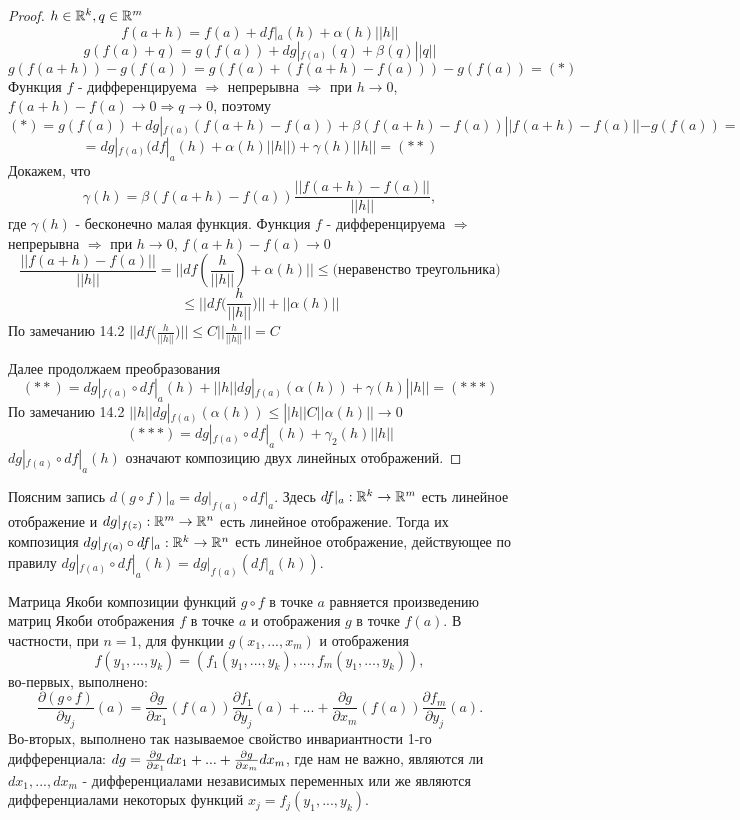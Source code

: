     \begin{proof}
    	$h \in \mathbb R^k, q \in \mathbb R^m$
    	\[ f(a + h) = f(a) + df|_a(h) + \alpha(h) ||h|| \]
    	\[ g(f(a) + q) = g(f(a)) + dg|_{f(a)}(q) + \beta(q)||q|| \]
    	\[ g(f(a + h)) - g(f(a)) = g(f(a) + (f(a + h) - f(a))) - g(f(a)) = (*) \]
    	Функция $f$ - дифференцируема $\Rightarrow$ непрерывна $\Rightarrow$ при $h \to 0$, $f(a + h) - f(a) \to 0 \Rightarrow q \to 0$, поэтому
    	\[ (*) = g(f(a)) + dg|_{f(a)}(f(a + h) - f(a)) + \beta(f(a + h) - f(a))||f(a + h) - f(a)|| - g(f(a)) = \]
    	\[ = dg|_{f(a)}(df|_a(h) + \alpha(h)||h||) + \gamma(h)||h|| = (**) \]
    	Докажем, что 
    	\[ \gamma(h) = \beta(f(a + h) - f(a))\frac{||f(a + h) - f(a)||}{||h||}, \]
    	где $\gamma(h)$ - бесконечно малая функция.
    	Функция $f$ - дифференцируема $\Rightarrow$ непрерывна $\Rightarrow$ при $h \to 0$, $f(a + h) - f(a) \to 0$
    	\[ \frac{||f(a + h) - f(a)||}{||h||} = ||df(\frac{h}{||h||}) + \alpha(h)|| \leqslant \text{(неравенство треугольника)} \]
    	\[ \leqslant ||df\bigg(\frac{h}{||h||}\bigg)|| + ||\alpha(h)|| \]
    	По замечанию 14.2 $||df\big(\frac{h}{||h||}\big)|| \leqslant C||\frac{h}{||h||}|| = C$
    	
    	Далее продолжаем преобразования
    	\[ (**) = dg|_{f(a)} \circ df|_a{(h)} + ||h||dg|_{f(a)}(\alpha(h)) + \gamma(h)||h|| = (***) \]
    	По замечанию 14.2 $||h||dg|_{f(a)}(\alpha(h)) \leqslant ||h||C||\alpha(h)|| \to 0$
    	\[ (***) = dg|_{f(a)} \circ df|_a{(h)} + \gamma_2(h)||h|| \]
    	$dg|_{f(a)} \circ df|_a{(h)}$ означают композицию двух линейных отображений.
    \end{proof}
    
    \begin{mention}
    	Поясним запись $d(g \circ f)|_a = dg|_{f(a)} \circ df|_a$. Здесь $df|_a : \mathbb R^k \rightarrow \mathbb R^m$ есть линейное отображение и $dg|_{f(z)} : \mathbb R^m \rightarrow \mathbb R^n$ есть линейное отображение. Тогда их композиция $dg|_{f(a)} \circ df|_a : \mathbb R^k \rightarrow \mathbb R^n$ есть линейное отображение, действующее по правилу $dg|_{f(a)} \circ df|_a (h) = dg|_{f(a)} (df|_a (h))$.
    \end{mention}
    
    \begin{mention}
    	Матрица Якоби композиции функций $g \circ f$ в точке $a$ равняется произведению матриц Якоби отображения $f$ в точке $a$ и отображения $g$ в точке $f(a)$. В частности, при $n = 1$, для функции $g(x_1, ..., x_m)$ и отображения
    	\[ f(y_1, ..., y_k) = (f_1(y_1, ..., y_k), ..., f_m(y_1, ..., y_k)), \]
    	во-первых, выполнено:
    	\[ \frac{\partial (g \circ f)}{\partial y_j}(a) = \frac{\partial g}{\partial x_1}(f(a)) \frac{\partial f_1}{\partial y_j}(a) + ... + \frac{\partial g}{\partial x_m}(f(a)) \frac{\partial f_m}{\partial y_j}(a). \]
    	Во-вторых, выполнено так называемое свойство инвариантности 1-го дифференциала: $dg = \pdv{g}{x_1}dx_1 + ... + \pdv{g}{x_m}dx_m$, где нам не важно, являются ли $dx_1, ..., dx_m$ - дифференциалами независимых переменных или же являются дифференциалами некоторых функций $x_j = f_j(y_1, ..., y_k)$.
    \end{mention}
    

